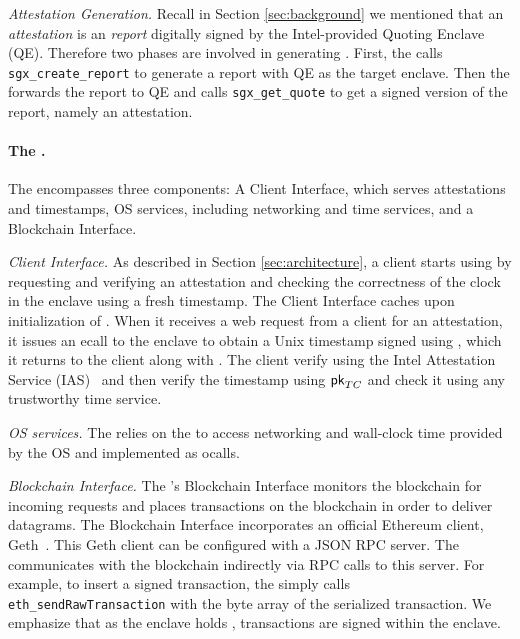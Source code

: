 \vspace{2mm}

\noindent\emph{Attestation Generation.} Recall in Section \ref{sec:background}
we mentioned that an \emph{attestation} is an \emph{report} digitally signed by
the Intel-provided Quoting Enclave (QE).  Therefore two phases are involved in
generating \att. First, the \encname calls \texttt{sgx\_create\_report} to
generate a report with QE as the target enclave. Then the \medname forwards the
report to QE and calls \texttt{sgx\_get\_quote} to get a signed version of the
report, namely an attestation.

\paragraph{The \medname.} The \medname encompasses three components: A Client Interface, which serves attestations and timestamps, OS services, including networking and time services, and a Blockchain Interface. 

\vspace{2mm}

\noindent\emph{Client Interface.} As described in Section \ref{sec:architecture},
a client starts using \tc by requesting and verifying an attestation \att and checking the correctness of the clock in the \tc enclave using a fresh timestamp.
The Client Interface caches \att upon initialization of \engine. When it receives a web request from a client for an attestation,
it issues an ecall to the enclave to obtain a
Unix timestamp signed using \skTC, which it returns to the client along with \att. The client verify \att 
using the Intel Attestation Service (IAS)~\cite{} and then verify the timestamp using ${\sf pk}_{TC}$ and check it using any trustworthy time service. 

\vspace{2mm}

\noindent\emph{OS services.} The \encname relies on the \medname to access networking and 
wall-clock time provided by the OS and implemented as ocalls.

\vspace{2mm}

\noindent\emph{Blockchain Interface.} The \medname's Blockchain Interface monitors the
blockchain for incoming requests and places transactions on the blockchain in order to
deliver datagrams. The Blockchain Interface incorporates an 
official Ethereum client, Geth~\cite{geth}. This Geth client can be configured with a JSON RPC server.  
The \medname  communicates with the blockchain indirectly via RPC calls to this server. For example, to insert a signed transaction, the \medname simply calls
\texttt{eth\_sendRawTransaction} with the byte array of the serialized
transaction. We emphasize that as the enclave holds \skTC, transactions are signed within the enclave.


